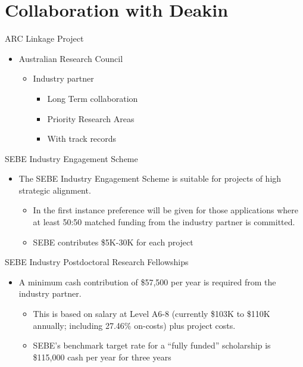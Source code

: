 \section{Collaboration with Deakin}

\begin{slide}{ARC Linkage Project}
\begin{itemize}
  \item Australian Research Council
   \begin{itemize}
          \item Industry partner
          \begin{itemize}
                  \item Long Term collaboration
                  \item Priority Research Areas
                  \item With track records
                \end{itemize}
        \end{itemize}
\end{itemize}

\end{slide}

\begin{slide}{SEBE Industry Engagement Scheme}
\begin{itemize}
  \item The SEBE Industry Engagement Scheme is suitable
        for projects of high strategic alignment.
  \begin{itemize}
    \item In the first instance preference will be given
          for those applications where
          at least 50:50 matched funding from the
          industry partner is committed.
    \item SEBE contributes \$5K-30K for each project
  \end{itemize}
\end{itemize}
\end{slide}


\begin{slide}{SEBE Industry Postdoctoral Research Fellowships}
\begin{itemize}
  \item A minimum cash contribution of \$57,500 per year is required
        from the industry partner.
  \begin{itemize}
    \item This is based on salary at Level A6-8
    (currently \$103K to \$110K annually; including 27.46\% on-costs)
    plus project costs.
    \item SEBE’s benchmark target rate for a ``fully funded” scholarship is \$115,000
          cash per year for three years
  \end{itemize}

\end{itemize}
\end{slide}